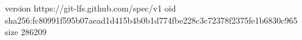 version https://git-lfs.github.com/spec/v1
oid sha256:fc80991f595b07aead1d415b4b0b1d774fbe228c3c72378f2375fe1b6830c965
size 286209
